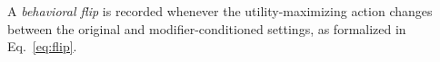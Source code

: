 \documentclass[11pt]{article}
\begin{document}
A \emph{behavioral flip} is recorded whenever the utility-maximizing action changes between the original and modifier-conditioned settings, as formalized in Eq.~\eqref{eq:flip}.



\end{document}
